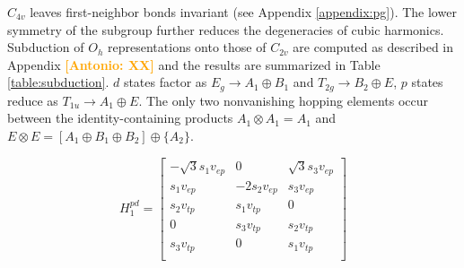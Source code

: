 \documentclass[twocolumn,showpacs,preprintnumbers,superscriptaddress,prb,floatfix,aps,10pt]{revtex4-1}
\newcommand{\abmei}[1]{\textcolor{orange}{ \bf [Antonio: #1] }}
\begin{document}
$C_{4v}$ leaves first-neighbor bonds invariant (see Appendix \ref{appendix:pg}). The lower symmetry of the subgroup further reduces the degeneracies of cubic harmonics. Subduction of $O_h$ representations onto those of $C_{2v}$ are computed as described in Appendix \abmei{XX} and the results are summarized in Table \ref{table:subduction}. $d$ states factor as $E_g \rightarrow A_1 \oplus B_1$ and $T_{2g} \rightarrow B_2 \oplus E$, $p$ states reduce as $T_{1u} \rightarrow A_1 \oplus E$. The only two nonvanishing hopping elements occur between the identity-containing products $A_1 \otimes A_1 = A_1$ and $E \otimes E = [ A_1 \oplus B_1 \oplus B_2 ] \oplus \{ A_2 \} $.

\begin{equation}
H_1^{pd} = 
\begin{bmatrix}
-\sqrt{3} s_1 v_{ep} & 0            & \sqrt{3} s_3 v_{ep}  \\ %
 s_1 v_{ep}          &-2 s_2 v_{ep} &  s_3 v_{ep}          \\ %
 s_2 v_{tp}          &  s_1 v_{tp}  & 0                    \\
0                    &  s_3 v_{tp}  &  s_2 v_{tp}          \\
 s_3 v_{tp}          & 0            &  s_1 v_{tp}          \\
\end{bmatrix}
\end{equation}
\end{document}
